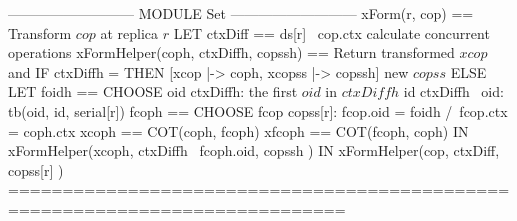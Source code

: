 \documentclass{article}
\begin{document}
\begin{tla}
--------------------------- MODULE Set ---------------------------
xForm(r, cop) == \* Transform $cop$ at replica $r$
    LET ctxDiff == ds[r] \ cop.ctx \* calculate concurrent operations
        xFormHelper(coph, ctxDiffh, copssh) == \* Return transformed $xcop$ and
            IF ctxDiffh = {} THEN [xcop |-> coph, xcopss |-> copssh]  \* new $copss$ 
            ELSE LET foidh == CHOOSE oid \in ctxDiffh: \* the first $oid$ in $ctxDiffh$ 
                                \A id \in ctxDiffh \ {oid}: tb(oid, id, serial[r]) 
                     fcoph == CHOOSE fcop \in copss[r]: 
                                fcop.oid = foidh /\ fcop.ctx = coph.ctx \* \cc
                     xcoph == COT(coph, fcoph)    xfcoph == COT(fcoph, coph)
                 IN  xFormHelper(xcoph, ctxDiffh \ {fcoph.oid}, 
                                        copssh )
    IN  xFormHelper(cop, ctxDiff, copss[r] ) 
=============================================================================
\end{tla}
\end{document}
